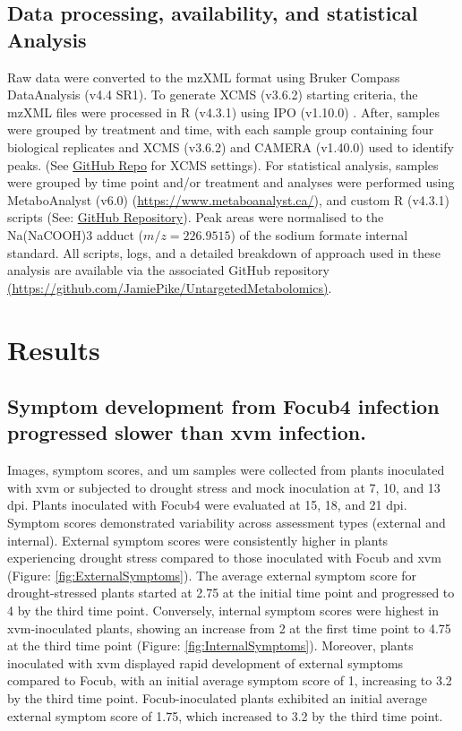 \subsection{Data processing, availability, and statistical Analysis}
Raw data were converted to the mzXML format using Bruker Compass DataAnalysis (v4.4 SR1). To generate XCMS (v3.6.2) \parencite{Benton2010} starting criteria, the mzXML files were processed in R (v4.3.1) \parencite{R} using IPO (v1.10.0) \parencite{Libiseller2015}. After, samples were  grouped by treatment and time, with each sample group containing four biological replicates and  XCMS (v3.6.2) \parencite{Benton2010} and CAMERA (v1.40.0) \parencite{Kuhl2012} used to identify peaks. (See \href{https://github.com/JamiePike/UntargetedMetabolomics/tree/main/NovDec22/XCMS}{GitHub Repo} for XCMS settings). For statistical analysis, samples were grouped by time point and/or treatment and analyses were performed using MetaboAnalyst (v6.0) (\href{https://www.metaboanalyst.ca/}{https://www.metaboanalyst.ca/}), and custom R (v4.3.1) \parencite{R} scripts (See: \href{https://github.com/JamiePike/UntargetedMetabolomics/tree/main}{GitHub Repository}). Peak areas were normalised to the Na(NaCOOH)3 adduct ($m/z=226.9515$) of the sodium formate internal standard. All scripts, logs, and a detailed breakdown of approach used in these analysis are available via the associated GitHub repository \href{https://github.com/JamiePike/UntargetedMetabolomics}{ (https://github.com/JamiePike/UntargetedMetabolomics)}. 

\newpage
\section{Results}

\subsection{Symptom development from \acl{Focub4} infection progressed slower than \acl{xvm} infection.}

Images, symptom scores, and \ac{um} samples were collected from plants inoculated with \ac{xvm} or subjected to drought stress and mock inoculation at 7, 10, and 13 \ac{dpi}. Plants inoculated with \ac{Focub4} were evaluated at 15, 18, and 21 \ac{dpi}. Symptom scores demonstrated variability across assessment types (external and internal). External symptom scores were consistently higher in plants experiencing drought stress compared to those inoculated with \ac{Focub} and \ac{xvm} (Figure: \ref{fig:ExternalSymptoms}). The average external symptom score for drought-stressed plants started at 2.75 at the initial time point and progressed to 4 by the third time point. Conversely, internal symptom scores were highest in \ac{xvm}-inoculated plants, showing an increase from 2 at the first time point to 4.75 at the third time point (Figure: \ref{fig:InternalSymptoms}). Moreover, plants inoculated with \ac{xvm} displayed rapid development of external symptoms compared to \ac{Focub}, with an initial average symptom score of 1, increasing to 3.2 by the third time point. \ac{Focub}-inoculated plants exhibited an initial average external symptom score of 1.75, which increased to 3.2 by the third time point. 


